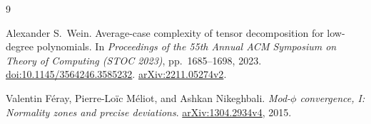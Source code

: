 \documentclass[11pt]{article}
\begin{document}
\begin{thebibliography}{9}

Alexander S.~Wein.
\newblock Average-case complexity of tensor decomposition for low-degree polynomials.
\newblock In \emph{Proceedings of the 55th Annual ACM Symposium on Theory of Computing (STOC 2023)}, pp.~1685--1698, 2023.
\newblock \href{https://doi.org/10.1145/3564246.3585232}{doi:10.1145/3564246.3585232}.
\newblock \href{https://arxiv.org/abs/2211.05274v2}{arXiv:2211.05274v2}.

Valentin F\'eray, Pierre-Lo\"ic M\'eliot, and Ashkan Nikeghbali.
\newblock \emph{Mod-\(\phi\) convergence, I: Normality zones and precise deviations}.
\newblock \href{https://arxiv.org/abs/1304.2934v4}{arXiv:1304.2934v4}, 2015.

\end{thebibliography}
\end{document}
